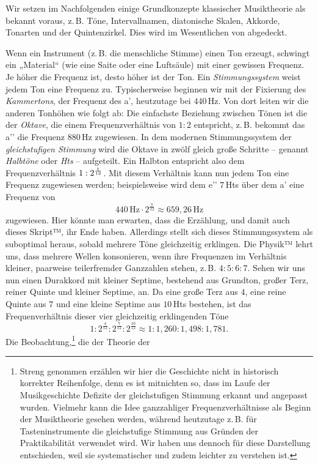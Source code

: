 Wir setzen im Nachfolgenden einige Grundkonzepte klassischer Musiktheorie als
bekannt voraus, z.\,B. Töne, Intervallnamen, diatonische Skalen, Akkorde,
Tonarten und der Quintenzirkel. Dies wird im Wesentlichen von
\cite[§\,1–6]{Skript} abgedeckt.

Wenn ein Instrument (z.\,B. die menschliche Stimme) einen Ton erzeugt, schwingt
ein „Material“ (wie eine Saite oder eine Luftsäule) mit einer gewissen Frequenz.
Je höher die Frequenz ist, desto höher ist der Ton. Ein \emph{Stimmungssystem}
weist jedem Ton eine Frequenz zu. Typischerweise beginnen wir mit der Fixierung
des \emph{Kammertons}, der Frequenz des a’, heutzutage bei $440$\,Hz. Von dort
leiten wir die anderen Tonhöhen wie folgt ab: Die einfachste Beziehung zwischen
Tönen ist die der \emph{Oktave}, die einem Frequenzverhältnis von $1:2$
entspricht, z.\,B. bekommt das a’’ die Frequenz $880$\,Hz zugewiesen. In dem
modernen Stimmungssystem der \emph{gleichstufigen Stimmung} wird die Oktave in
zwölf gleich große Schritte – genannt \emph{Halbtöne} oder \emph{Hts} – 
aufgeteilt. Ein Halbton entspricht also dem Frequenzverhältnis
$1:2^{\smash{\frac1{12}}}$. Mit diesem Verhältnis kann nun jedem Ton eine
Frequenz zugewiesen werden; beispielsweise wird dem e’’ $7$\,Hts
über dem a’ eine Frequenz von 
\[440\,\text{Hz}\cdot 2^{\frac7{12}} \approx 659{,}26\,\text{Hz}\]%
zugewiesen. Hier könnte man erwarten, dass die Erzählung, und damit auch dieses
Skript™, ihr Ende haben. Allerdings stellt sich dieses Stimmungssystem als
suboptimal heraus, sobald mehrere Töne gleichzeitig erklingen. Die Physik™ lehrt
uns, dass mehrere Wellen konsonieren, wenn ihre Frequenzen im Verhältnis
kleiner, paarweise teilerfremder Ganzzahlen stehen, z.\,B. $4:5:6:7$. Sehen wir
uns nun einen Durakkord mit kleiner Septime, bestehend aus Grundton, großer
Terz, reiner Quinte und kleiner Septime, an. Da eine große Terz aus $4$, eine
reine Quinte aus $7$ und eine kleine Septime aus $10$\,Hts bestehen,
ist das Frequenverhältnis dieser vier gleichzeitig erklingenden Töne
%
\[1:2^{\frac4{12}}:2^{\frac7{12}}:2^{\frac{10}{12}}\approx
  1:1{,}260:1{,}498:1{,}781.\]%
Die Beobachtung,\footnote{Streng genommen erzählen wir hier die Geschichte nicht
  in historisch korrekter Reihenfolge, denn es ist mitnichten so, dass im Laufe
  der Musikgeschichte Defizite der gleichstufigen Stimmung erkannt und angepasst
  wurden. Vielmehr kann die Idee ganzzahliger Frequenzverhältnisse als Beginn
  der Musiktheorie gesehen werden, während heutzutage z.\,B. für
  Tasteninstrumente die gleichstufige Stimmung aus Gründen der Praktikabilität
  verwendet wird. Wir haben uns dennoch für diese Darstellung entschieden, weil
  sie systematischer und zudem leichter zu verstehen ist.} die der Theorie der
